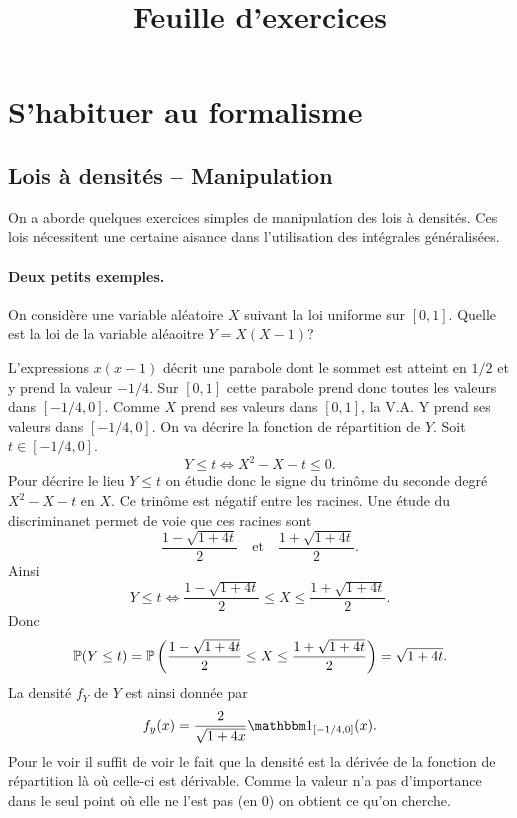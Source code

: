 \documentclass[11pt, a4paper]{article}
\title{%
  { \huge Feuille d'exercices}%
}
\author{}
\date{}
\begin{document}
\maketitle\thispagestyle{fancy}

\section{S'habituer au formalisme}
\label{sec:formalisme}


\subsection{Lois à densités -- Manipulation}

\noindent On a aborde quelques exercices simples de manipulation des lois à
densités. Ces lois nécessitent une certaine aisance dans l'utilisation
des intégrales généralisées.

\paragraph{Deux petits exemples.}

\begin{question}
  On considère une variable aléatoire $X$ suivant la loi uniforme sur
  $[0, 1]$. Quelle est la loi de la variable aléaoitre $Y = X(X-1)$?
\end{question}

\begin{solution}
  L'expressions $x(x-1)$ décrit une parabole dont le sommet est
  atteint en $1/2$ et y prend la valeur $-1/4$. Sur $[0, 1]$ cette
  parabole prend donc toutes les valeurs dans $[-1/4, 0]$. Comme $X$
  prend ses valeurs dans $[0, 1]$, la V.A. Y prend ses valeurs dans
  $[-1/4, 0]$. On va décrire la fonction de répartition de $Y$. Soit
  $t \in [-1/4, 0]$.
  \[
  Y \leq t \Longleftrightarrow X^2 - X - t \leq 0.
  \]
  Pour décrire le lieu $Y \leq t$ on étudie donc le signe du trinôme
  du seconde degré $X^2 - X - t$ en $X$. Ce trinôme est négatif entre
  les racines. Une étude du discriminanet permet de voie que ces
  racines sont
  \[
  \frac{1 - \sqrt{1+4t}}{2} \quad \textrm{et} \quad \frac{1 +
    \sqrt{1+4t}}{2}.
  \]
  Ainsi
  \[
  Y \leq t \Longleftrightarrow \frac{1 - \sqrt{1+4t}}{2} \leq X \leq
  \frac{1 + \sqrt{1+4t}}{2}.
  \]
  Donc
  \[
  \mathbb{P}(Y \leq t) = \mathbb{P}\left(\frac{1 - \sqrt{1+4t}}{2} \leq X \leq \frac{1 +
    \sqrt{1+4t}}{2}\right) = \sqrt{1+4t}.
  \]
  La densité $f_Y$ de $Y$ est ainsi donnée par
  \[
  f_y(x) = \frac{2}{\sqrt{1 + 4x}}\bOne_{[-1/4, 0]}(x).
  \]
  Pour le voir il suffit de voir le fait que la densité est la dérivée
  de la fonction de répartition là où celle-ci est dérivable. Comme la
  valeur n'a pas d'importance dans le seul point où elle ne l'est pas
  (en $0$) on obtient ce qu'on cherche.
\end{solution}
\end{document}
